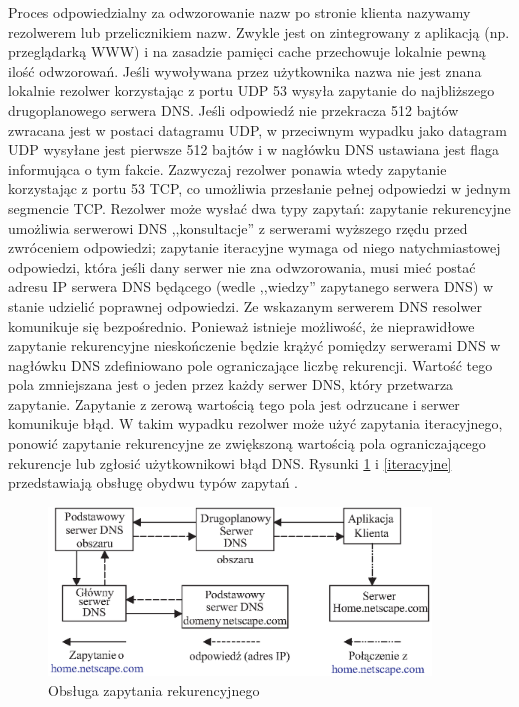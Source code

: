 Proces odpowiedzialny za odwzorowanie nazw po stronie klienta nazywamy rezolwerem lub przelicznikiem nazw. 
Zwykle jest on zintegrowany z aplikacją (np. przeglądarką WWW) i na zasadzie pamięci cache przechowuje lokalnie 
pewną ilość odwzorowań. Jeśli wywoływana przez użytkownika nazwa nie jest znana lokalnie rezolwer korzystając z 
portu UDP 53 wysyła zapytanie do najbliższego drugoplanowego serwera DNS. Jeśli odpowiedź nie przekracza 512 
bajtów zwracana jest w postaci datagramu UDP, w przeciwnym wypadku jako datagram UDP wysyłane jest pierwsze 512 
bajtów i w nagłówku DNS ustawiana jest flaga informująca o tym fakcie. Zazwyczaj rezolwer ponawia wtedy 
zapytanie korzystając z portu 53 TCP, co umożliwia przesłanie pełnej odpowiedzi w jednym segmencie TCP. Rezolwer 
może wysłać dwa typy zapytań: zapytanie rekurencyjne umożliwia serwerowi DNS ,,konsultacje'' z serwerami wyższego 
rzędu przed zwróceniem odpowiedzi; zapytanie iteracyjne wymaga od niego natychmiastowej odpowiedzi, która jeśli 
dany serwer nie zna odwzorowania, musi mieć postać adresu IP serwera DNS będącego (wedle ,,wiedzy'' zapytanego 
serwera DNS) w stanie udzielić poprawnej odpowiedzi. Ze wskazanym serwerem DNS resolwer komunikuje się 
bezpośrednio. Ponieważ istnieje możliwość, że  nieprawidłowe zapytanie rekurencyjne nieskończenie będzie krążyć 
pomiędzy serwerami DNS w nagłówku DNS zdefiniowano pole ograniczające liczbę rekurencji. Wartość tego pola 
zmniejszana jest o jeden przez każdy serwer DNS, który przetwarza zapytanie. Zapytanie z zerową wartością tego 
pola jest odrzucane i serwer komunikuje błąd. W takim wypadku rezolwer może użyć zapytania iteracyjnego, ponowić 
zapytanie rekurencyjne ze zwiększoną wartością pola ograniczającego rekurencje lub zgłosić użytkownikowi błąd 
DNS. Rysunki \ref{rekurencyjne} i \ref{iteracyjne} przedstawiają obsługę obydwu typów zapytań \cite{barylo3}.
\begin{figure}[h]
\centering
\includegraphics[width=4in]{./rysunki/zapytanie_rekurencyjne.eps}
\caption{Obsługa zapytania rekurencyjnego}
\label{rekurencyjne}
\end{figure}

